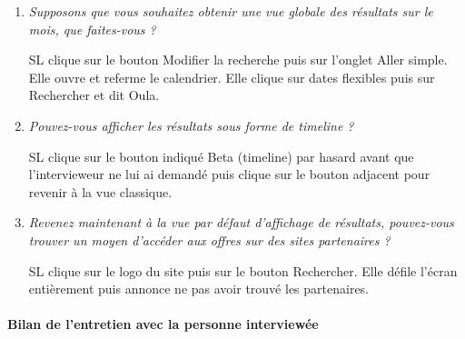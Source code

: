 \begin{enumerate}
\item \textit{Supposons que vous souhaitez obtenir une vue globale des r\'{e}sultats sur le mois, que faites-vous ?}

SL clique sur le bouton \og{}Modifier la recherche\fg{} puis sur l'onglet \og{}Aller simple\fg{}. Elle ouvre et referme le calendrier. Elle clique sur \og{}dates flexibles\fg{} puis sur \og{}Rechercher\fg{} et dit \og{}Oula\fg{}.


\item \textit{Pouvez-vous afficher les r\'{e}sultats sous forme de timeline ?}

SL clique sur le bouton indiqu\'{e} Beta (timeline) par hasard avant que l'intervieweur ne lui ai demand\'{e} puis clique sur le bouton adjacent pour revenir \`{a} la vue classique.


\item \textit{Revenez maintenant \`{a} la vue par d\'{e}faut d'affichage de r\'{e}sultats, pouvez-vous trouver un moyen d'acc\'{e}der aux offres sur des sites partenaires ?}

SL clique sur le logo du site puis sur le bouton \og{}Rechercher\fg{}.
Elle d\'{e}file l'\'{e}cran enti\`{e}rement puis annonce ne pas avoir trouv\'{e} les partenaires.


\end{enumerate}

\paragraph{Bilan de l'entretien avec la personne interview\'{e}e}

